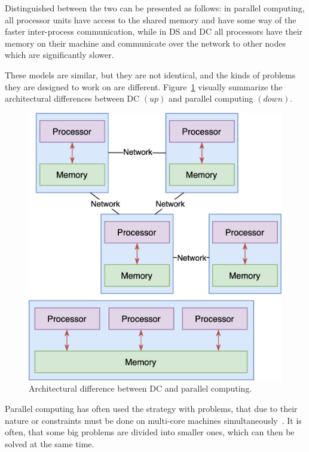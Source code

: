 Distinguished between the two can be presented as follows: in parallel computing, all processor units have access to the shared memory and have some way of the faster inter-process communication, while in DS and DC all processors have their memory on their machine and communicate over the network to other nodes which are significantly slower. 

These models are similar, but they are not identical, and the kinds of problems they are designed to work on are different. Figure~\ref{fig:fig4} visually summarize the architectural  differences between DC $(up)$ and parallel computing $(down)$.

\begin{figure}[H]
	\begin{center}
		\includegraphics[scale=0.8]{images/Figure4.png}
	\end{center}
	\vspace{-0.6cm}
	\caption{Architectural difference between DC and parallel computing.}
	\label{fig:fig4}
\end{figure}

Parallel computing has often used the strategy with problems, that due to their nature or constraints must be done on multi-core machines simultaneously~\cite{0072397}. It is often, that some big problems are divided into smaller ones, which can then be solved at the same time. 

